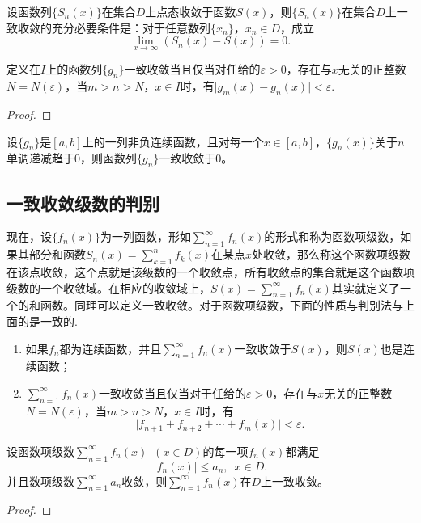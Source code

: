     \begin{theorem}
        设函数列\(\{S_n(x)\}\)在集合\(D\)上点态收敛于函数\(S(x)\)，则\(\{S_n(x)\}\)在集合\(D\)上一致收敛的充分必要条件是：对于任意数列\(\{x_n\}\)，\enspace\(x_n\in D\)，成立\[\lim_{x\to \infty}(S_n(x)-S(x))=0.\]
    \end{theorem}


    \begin{theorem}[Cauchy准则]
        定义在\(I\)上的函数列\(\{g_n\}\)一致收敛当且仅当对任给的\(\varepsilon>0\)，存在与\(x\)无关的正整数\(N = N(\varepsilon)\)，当\(m>n>N\)，\enspace\(x\in I\)时，有\(\vert g_m(x)-g_n(x)\vert<\varepsilon.\)    
    \end{theorem}
    \begin{proof}
        
    \end{proof}
    \begin{theorem}[Dini定理]
        设\(\{g_n\}\)是\([a,b]\)上的一列非负连续函数，且对每一个\(x\in[a,b]\)，\enspace\(\{g_n(x)\}\)关于\(n\)单调递减趋于\(0\)，则函数列\(\{g_n\}\)一致收敛于\(0\)。
    \end{theorem}


\subsection{一致收敛级数的判别}

    现在，设\(\{f_n(x)\}\)为一列函数，形如\(\sum\limits_{n=1}^{\infty}f_n(x)\)的形式和称为函数项级数，如果其部分和函数\(S_n(x) = \sum\limits_{k=1}^{n}f_k(x)\)在某点\(x\)处收敛，那么称这个函数项级数在该点收敛，这个点就是该级数的一个收敛点，所有收敛点的集合就是这个函数项级数的一个收敛域。在相应的收敛域上，\(S(x) = \sum\limits_{n=1}^{\infty}f_n(x)\)其实就定义了一个的{\heiti 和函数}。同理可以定义一致收敛。对于函数项级数，下面的性质与判别法与上面的是一致的.
    \begin{enumerate}
        \item 如果\(f_n\)都为连续函数，并且\(\sum\limits_{n=1}^{\infty}f_n(x)\)一致收敛于\(S(x)\)，则\(S(x)\)也是连续函数；
        \item \(\sum\limits_{n=1}^{\infty}f_n(x)\)一致收敛当且仅当对于任给的\(\varepsilon>0\)，存在与\(x\)无关的正整数\(N = N(\varepsilon)\)，当\(m>n>N\)，\enspace\(x\in I\)时，有\[\vert f_{n+1}+f_{n+2}+\cdots+f_{m}(x)\vert<\varepsilon.\]
    \end{enumerate}

    \begin{theorem}[Weierrstrass判别法]
        设函数项级数\(\sum\limits_{n=1}^{\infty}f_n(x)\enspace (x\in D)\)的每一项\(f_n(x)\)都满足\[\lvert f_n(x)\rvert\leq a_n,\enspace x\in D.\]
        并且数项级数\(\sum\limits_{n=1}^{\infty}a_n\)收敛，则\(\sum\limits_{n=1}^{\infty}f_n(x)\)在\(D\)上一致收敛。
    \end{theorem}
    \begin{proof}
        
    \end{proof}

